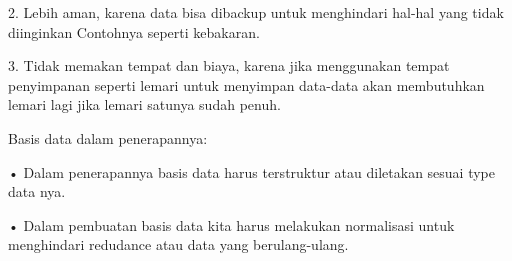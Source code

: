 \documentclass{article}
\begin{document}
\par 2.	Lebih aman, karena data bisa dibackup untuk menghindari  hal-hal yang tidak diinginkan 
Contohnya seperti kebakaran.
\par 3.	Tidak memakan tempat dan biaya, karena jika menggunakan  tempat penyimpanan seperti lemari untuk menyimpan data-data akan  membutuhkan lemari lagi jika lemari satunya sudah penuh.
\vspace{0,5}\\
\par Basis data dalam penerapannya:
\par •	Dalam penerapannya basis data harus terstruktur atau  diletakan sesuai type data nya.
\par •	Dalam pembuatan basis data kita harus melakukan normalisasi  untuk menghindari redudance atau data yang berulang-ulang.
\end{document}
